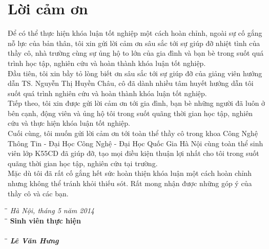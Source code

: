 \chapter*{Lời cảm ơn}

Để có thể thực hiện khóa luận tốt nghiệp một cách hoàn chỉnh, ngoài sự cố gắng nỗ lực của bản thân, tôi xin gửi lời cảm ơn sâu sắc tới sự giúp đỡ nhiệt tình của thầy cô, nhà trường cùng sự ủng hộ to lớn của gia đình và bạn bè trong suốt quá trình học tập, nghiên cứu và hoàn thành khóa luận tốt nghiệp.\\

Đầu tiên, tôi xin bầy tỏ lòng biết ơn sâu sắc tới sự giúp đỡ của giảng viên hướng dẫn TS. Nguyễn Thị Huyền Châu, cô đã dành nhiều tâm huyết hướng dẫn tôi suốt quá trình nghiên cứu và hoàn thành khóa luận tốt nghiệp.\\

Tiếp theo, tôi xin được gửi lời cảm ơn tới gia đình, bạn bè những người đã luôn ở bên cạnh, động viên và ủng hộ tôi trong suốt quãng thời gian học tập, nghiên cứu và thực hiện khóa luận tốt nghiệp.\\ 

Cuối cùng, tôi muốn gửi lời cảm ơn tới toàn thể thầy cô trong khoa Công Nghệ Thông Tin - Đại Học Công Nghệ - Đại Học Quốc Gia Hà Nội cùng toàn thể sinh viên lớp K55CD đã giúp đỡ, tạo mọi điều kiện thuận lợi nhất cho tôi trong suốt quãng thời gian học tập, nghiên cứu tại trường. \\

Mặc dù tôi đã rất cố gắng hết sức hoàn thiện khóa luận một cách hoàn chỉnh nhưng không thể tránh khỏi thiếu sót. Rất mong nhận được những góp ý của thầy cô và các bạn. 

\vspace{2 cm}
\begin{tabbing}
\hspace{3in} \= \= \kill
\> \textit{Hà Nội, tháng 5 năm 2014}\\
\hspace{3.2in} \= \= \kill
\> \textbf{Sinh viên thực hiện}\\\\
\hspace{3.3in} \= \= \kill
\> \textbf{\textit{Lê Văn Hưng}}
\end{tabbing}